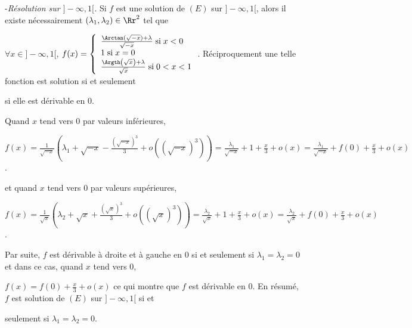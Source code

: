 {\begin{enumerate}
{-\textit{Résolution sur $]-\infty,1[$.} Si $f$ est une solution de $(E)$ sur $]-\infty,1[$, alors il existe nécessairement $(\lambda_1,\lambda_2)\in\Rr^2$ tel que

$\forall x\in]-\infty,1[$, $f(x)=\left\{
\begin{array}{l}
 \frac{\Arctan(\sqrt{-x})+\lambda}{\sqrt{-x}}\;\text{si}\;x<0\\
1\;\text{si}\;x=0\\
 \frac{\Argth\left(\sqrt{x}\right)+\lambda}{\sqrt{x}}\;\text{si}\;0<x<1
\end{array}
\right.$. Réciproquement une telle fonction est solution si et seulement

si elle est dérivable en $0$.

Quand $x$ tend vers $0$ par valeurs inférieures,

\begin{center}
$f(x)= \frac{1}{\sqrt{-x}}\left(\lambda_1+\sqrt{-x}- \frac{\left(\sqrt{-x}\right)^3}{3}+o\left((\sqrt{-x})^3\right)\right)= \frac{\lambda_1}{\sqrt{-x}}+1+ \frac{x}{3}+o(x)= \frac{\lambda_1}{\sqrt{-x}}+f(0)+ \frac{x}{3}+o(x)$.
\end{center}

et quand $x$ tend vers $0$ par valeurs supérieures,

\begin{center}
$f(x)= \frac{1}{\sqrt{x}}\left(\lambda_2+\sqrt{x}+ \frac{\left(\sqrt{x}\right)^3}{3}+o\left((\sqrt{x})^3\right)\right)= \frac{\lambda_2}{\sqrt{x}}+1+ \frac{x}{3}+o(x)= \frac{\lambda_2}{\sqrt{x}}+f(0)+ \frac{x}{3}+o(x)$.
\end{center}

Par suite, $f$ est dérivable à droite et à gauche en $0$ si et seulement si $\lambda_1=\lambda_2=0$ et dans ce cas, quand $x$ tend vers $0$,

$f(x)=f(0)+ \frac{x}{3}+o(x)$ ce qui montre que $f$ est dérivable en $0$. En résumé, $f$ est solution de $(E)$ sur $]-\infty,1[$ si et

seulement si $\lambda_1=\lambda_2=0$.

}
\end{enumerate}}
